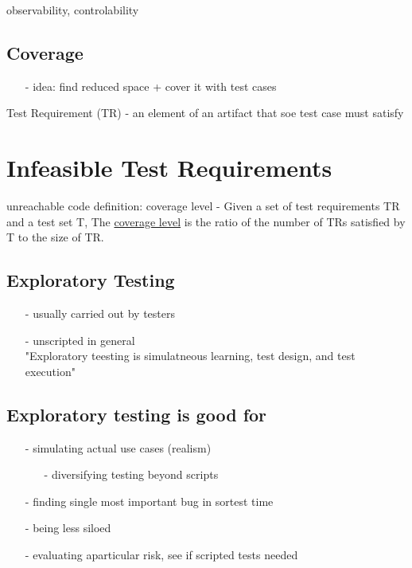 \documentclass[10pt,usletter]{article}
\newcommand{\tab}[1][1cm]{\hspace*{#1}}
\begin{document}
\huge{observability, controlability}
\subsection{Coverage}
\normalsize
\begin{enumerate}
\item[-] idea: find reduced space + cover it with test cases
\end{enumerate}
Test Requirement (TR) - an element of an artifact that soe test case must satisfy

\section*{Infeasible Test Requirements}
unreachable code
definition: coverage level - Given a set of test requirements TR and a test set T, The \underline{coverage level} is the ratio of the number of TRs satisfied by T to the size of TR.

\subsection*{Exploratory Testing}
\begin{enumerate}
\item[-] usually carried out by testers
\item[-] unscripted in general\\
\tab "Exploratory teesting is simulatneous learning, test design, and test execution"
\end{enumerate}
\subsection*{Exploratory testing is good for}
\begin{enumerate}
\item[-] simulating actual use cases (realism)
\begin{enumerate}
\item[-] diversifying testing beyond scripts
\end{enumerate}
\item[-] finding single most important bug in sortest time
\item[-] being less siloed
\item[-] evaluating aparticular risk, see if scripted tests needed
\end{enumerate}
\end{document}
